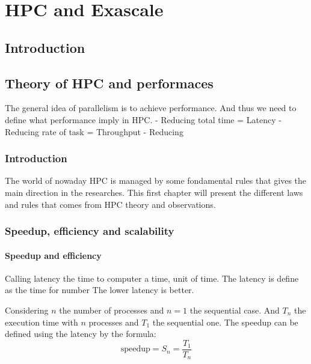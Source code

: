 \part{HPC and Exascale}
\chapter*{Introduction}


\chapter{Theory of HPC and performaces}

The general idea of parallelism is to achieve performance. 
And thus we need to define what performance imply in HPC. 
- Reducing total time = Latency 
- Reducing rate of task = Throughput 
- Reducing 

\section{Introduction}
The world of nowaday HPC is managed by some fondamental rules that gives the main direction in the researches. 
This first chapter will present the different laws and rules that comes from HPC theory and observations. 


\section{Speedup, efficiency and scalability}


\subsection{Speedup and efficiency}
Calling latency the time to computer a time, unit of time. 
The latency is define as the time for number
The lower latency is better. 

Considering $n$ the number of processes and $n=1$ the sequential case.
And $T_n$ the execution time with $n$ processes and $T_1$ the sequential one. 
The speedup can be defined using the latency by the formula: 
\begin{equation}
\text{speedup} = S_n =  \frac{T_1}{T_n}
\end{equation}


